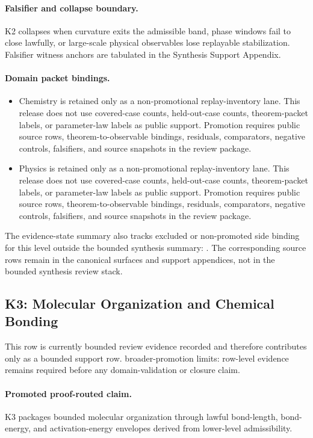 \paragraph{Falsifier and collapse boundary.}
K2 collapses when curvature exits the admissible band, phase windows fail to close lawfully, or large-scale physical observables lose replayable stabilization.
Falsifier witness anchors are tabulated in the Synthesis Support Appendix.

\paragraph{Domain packet bindings.}
\begin{itemize}[leftmargin=1.6em,nosep]
\item Chemistry is retained only as a non-promotional replay-inventory lane. This release does not use covered-case counts, held-out-case counts, theorem-packet labels, or parameter-law labels as public support. Promotion requires public source rows, theorem-to-observable bindings, residuals, comparators, negative controls, falsifiers, and source snapshots in the review package.
\item Physics is retained only as a non-promotional replay-inventory lane. This release does not use covered-case counts, held-out-case counts, theorem-packet labels, or parameter-law labels as public support. Promotion requires public source rows, theorem-to-observable bindings, residuals, comparators, negative controls, falsifiers, and source snapshots in the review package.
\end{itemize}
The evidence-state summary also tracks  excluded or non-promoted side binding for this level outside the bounded synthesis summary: . The corresponding source rows remain in the canonical surfaces and support appendices, not in the bounded synthesis review stack.

\subsection{K3: Molecular Organization and Chemical Bonding}
\label{sec:oc-core-1-3-synthesis-k3}
This row is currently bounded review evidence recorded and therefore contributes only as a bounded support row.
broader-promotion limits: row-level evidence remains required before any domain-validation or closure claim.

\paragraph{Promoted proof-routed claim.}
K3 packages bounded molecular organization through lawful bond-length, bond-energy, and activation-energy envelopes derived from lower-level admissibility.

